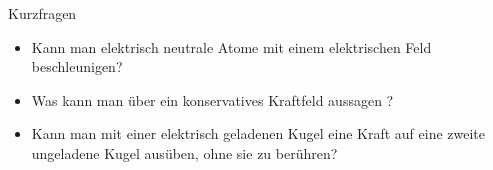 \begin{frame}{Kurzfragen}
    \begin{itemize}
        \item Kann man elektrisch neutrale Atome mit einem elektrischen Feld beschleunigen?
        \item Was kann man über ein konservatives Kraftfeld aussagen ?
        \item <3-> Kann man mit einer elektrisch geladenen Kugel eine Kraft auf eine zweite ungeladene Kugel ausüben, ohne sie zu berühren?
    \end{itemize}
\end{frame}